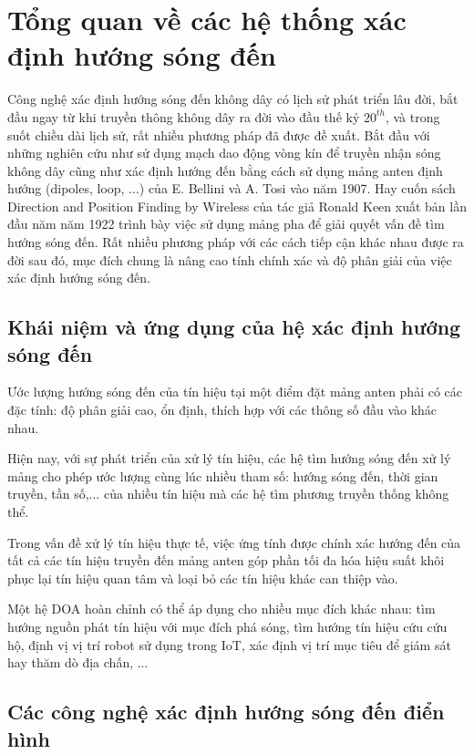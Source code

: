 \setcounter{chapter}{0}
\chapter[\MakeUppercase{Tổng quan về các hệ thống xác định hướng sóng đến}]{Tổng quan về các hệ thống xác định hướng sóng đến}

Công nghệ xác định hướng sóng đến không dây có lịch sử phát triển lâu đời, bắt đầu ngay từ khi truyền thông không dây ra đời vào đầu thế kỷ $20^{th}$, và trong suốt chiều dài lịch sử, rất nhiều phương pháp đã được đề xuất. Bắt đầu với những nghiên cứu như sử dụng mạch dao động vòng kín để truyền nhận sóng không dây cũng như xác định hướng đến bằng cách sử dụng mảng anten định hướng (dipoles, loop, ...) của  E. Bellini  và  A. Tosi \cite{Bellini1907} vào năm 1907. Hay cuốn sách Direction and Position Finding by Wireless \cite{Darwin1895} của tác giả Ronald Keen xuất bản lần đầu năm năm 1922 trình bày việc sử dụng mảng pha để giải quyết vấn đề tìm hướng sóng đến. Rất nhiều phương pháp với các cách tiếp cận khác nhau được ra đời sau đó, mục đích chung là nâng cao tính chính xác và độ phân giải của việc xác định hướng sóng đến.

\section{Khái niệm và ứng dụng của hệ xác định hướng sóng đến}

Ước lượng hướng sóng đến của tín hiệu tại một điểm đặt mảng anten phải có các đặc tính: độ phân giải cao, ổn định, thích hợp với các thông số đầu vào khác nhau.

Hiện nay, với sự phát triển của xử lý tín hiệu, các hệ tìm hướng sóng đến xử lý mảng cho phép ước lượng cùng lúc nhiều tham số: hướng sóng đến, thời gian truyền, tần số,... của nhiều tín hiệu mà các hệ tìm phương truyền thống không thể.

Trong vấn đề xử lý tín hiệu thực tế, việc ứng tính được chính xác hướng đến của tất cả các tín hiệu truyền đến mảng anten góp phần tối đa hóa hiệu suất khôi phục lại tín hiệu quan tâm và loại bỏ các tín hiệu khác can thiệp vào.

Một hệ DOA hoàn chỉnh có thể áp dụng cho nhiều mục đích khác nhau: tìm hướng nguồn phát tín hiệu với mục đích phá sóng, tìm hướng tín hiệu cứu cứu hộ, định vị vị trí robot sử dụng trong IoT, xác định vị trí mục tiêu để giám sát hay thăm dò địa chấn, ...
\newpage
\section{Các công nghệ xác định hướng sóng đến điển hình}

